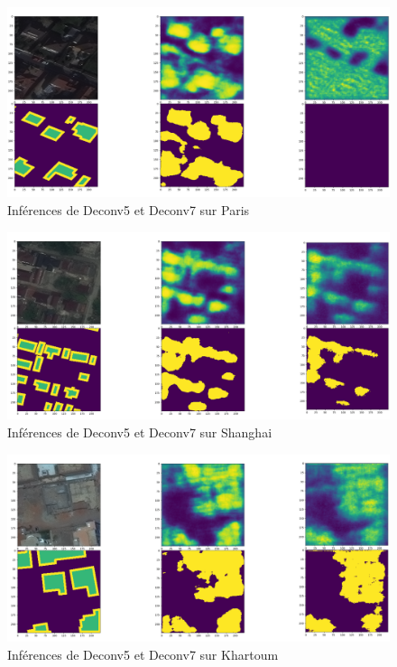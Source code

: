 \documentclass[a4paper, 11pt]{report}
\begin{document}
\begin{figure}[H]
	\centering
	\includegraphics[scale=0.225]{Images/Deconvs_Paris.png}
	\caption{Inférences de Deconv5 et Deconv7 sur Paris}
\end{figure}

\begin{figure}[H]
	\centering
	\includegraphics[scale=0.225]{Images/Deconvs_Shanghai.png}
	\caption{Inférences de Deconv5 et Deconv7 sur Shanghai}
\end{figure}

\begin{figure}[H]
	\centering
	\includegraphics[scale=0.225]{Images/Deconvs_Khartoum.png}
	\caption{Inférences de Deconv5 et Deconv7 sur Khartoum}
\end{figure}
\end{document}
